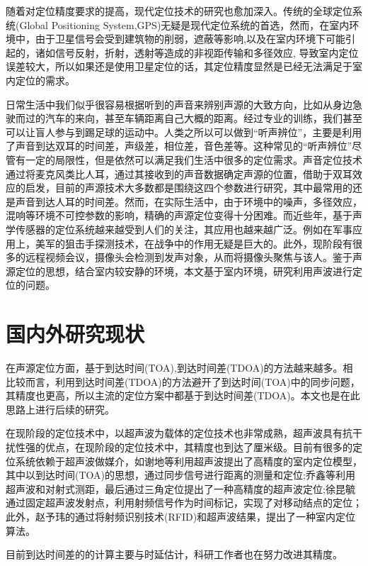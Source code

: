 \documentclass[winfonts]{njuthesis}
\begin{document}
		随着对定位精度要求的提高，现代定位技术的研究也愈加深入。传统的全球定位系统(Global Positioning System,GPS)\cite{wikipedia_GPS}无疑是现代定位系统的首选，然而，在室内环境中，由于卫星信号会受到建筑物的削弱，遮蔽等影响,以及在室内环境下可能引起的，诸如信号反射，折射，透射等造成的非视距传输和多径效应, 导致室内定位误差较大，所以如果还是使用卫星定位的话，其定位精度显然是已经无法满足于室内定位的需求。
		
		日常生活中我们似乎很容易根据听到的声音来辨别声源的大致方向，比如从身边急驶而过的汽车的来向，甚至车辆距离自己大概的距离。经过专业的训练，我们甚至可以让盲人参与到踢足球的运动中。人类之所以可以做到“听声辨位”，主要是利用了声音到达双耳的时间差，声级差，相位差，音色差等。这种常见的“听声辨位”尽管有一定的局限性，但是依然可以满足我们生活中很多的定位需求。声音定位技术通过将麦克风类比人耳，通过其接收到的声音数据确定声源的位置，借助于双耳效应的启发，目前的声源技术大多数都是围绕这四个参数进行研究，其中最常用的还是声音到达人耳的时间差。然而，在实际生活中，由于环境中的噪声，多径效应，混响等环境不可控参数的影响，精确的声源定位变得十分困难。而近些年，基于声学传感器的定位系统越来越受到人们的关注，其应用也越来越广泛。例如在军事应用上，美军的狙击手探测技术，在战争中的作用无疑是巨大的。此外，现阶段有很多的远程视频会议，摄像头会检测到发声对象，从而将摄像头聚焦与该人。鉴于声源定位的思想，结合室内较安静的环境，本文基于室内环境，研究利用声波进行定位的问题。

	
		
	\section{国内外研究现状}
		
		在声源定位方面，基于到达时间(TOA),到达时间差(TDOA)的方法越来越多。相比较而言，利用到达时间差(TDOA)的方法避开了到达时间(TOA)中的同步问题，其精度也更高，所以主流的定位方案中都基于到达时间差(TDOA)。本文也是在此思路上进行后续的研究。
		
		在现阶段的定位技术中，以超声波为载体的定位技术也非常成熟，超声波具有抗干扰性强的优点，在现阶段的定位技术中，其精度也到达了厘米级。目前有很多的定位系统依赖于超声波做媒介，如谢地等\cite{xiedi}利用超声波提出了高精度的室内定位模型，其中以到达时间(TOA)的思想，通过同步信号进行距离的测量和定位;乔鑫等\cite{qiaoxin}利用超声波和对射式测距，最后通过三角定位提出了一种高精度的超声波定位;徐昆毓\cite{xukunyu}通过固定超声波发射点，利用射频信号作为时间标记，实现了对移动结点的定位；此外，赵予玮\cite{zhaoyuwei}的通过将射频识别技术(RFID)和超声波结果，提出了一种室内定位算法。
		
		目前到达时间差的的计算主要与时延估计，科研工作者也在努力改进其精度。
		
\end{document}
